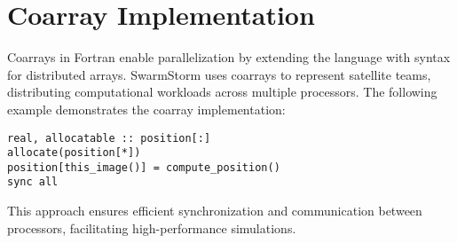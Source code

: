 % 

\section{Coarray Implementation}
Coarrays in Fortran enable parallelization by extending the language with syntax for distributed arrays. SwarmStorm uses coarrays to represent satellite teams, distributing computational workloads across multiple processors. The following example demonstrates the coarray implementation:

\begin{lstlisting}
real, allocatable :: position[:]
allocate(position[*])
position[this_image()] = compute_position()
sync all
\end{lstlisting}

This approach ensures efficient synchronization and communication between processors, facilitating high-performance simulations.
	

\endinput  %
